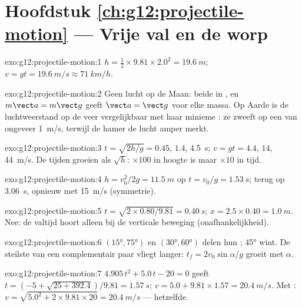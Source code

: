 \section*{Hoofdstuk \ref{ch:g12:projectile-motion} --- Vrije val en de worp}

\begin{solution}{exo:g12:projectile-motion:1}
$h = \tfrac12 \times 9.81 \times 2.0^2 = \qty{19.6}{m}$;
$v = gt = \qty{19.6}{m/s} \approx \qty{71}{km/h}$.
\end{solution}

\begin{solution}{exo:g12:projectile-motion:2}
Geen lucht op de Maan: beide in , en $m\vect a = m\vect g$ geeft
$\vect a = \vect g$ voor elke massa. Op Aarde is de luchtweerstand op de veer
vergelijkbaar met haar minieme : ze zweeft op een  van
ongeveer \qty{1}{m/s}, terwijl de hamer de lucht amper merkt.
\end{solution}

\begin{solution}{exo:g12:projectile-motion:3}
$t = \sqrt{2h/g} = 0.45$, $1.4$, \qty{4.5}{s};
$v = gt = 4.4$, $14$, \qty{44}{m/s}. De tijden groeien als $\sqrt h$:
$\times 100$ in hoogte is maar $\times 10$ in tijd.
\end{solution}

\begin{solution}{exo:g12:projectile-motion:4}
$h = v_0^2/2g = \qty{11.5}{m}$ op $t = v_0/g = \qty{1.53}{s}$; terug op
\qty{3.06}{s}, opnieuw met \qty{15}{m/s} (symmetrie).
\end{solution}

\begin{solution}{exo:g12:projectile-motion:5}
$t = \sqrt{2 \times 0.80/9.81} = \qty{0.40}{s}$;
$x = 2.5 \times 0.40 = \qty{1.0}{m}$. Nee: de valtijd hoort alleen bij de
verticale beweging (onafhankelijkheid).
\end{solution}

\begin{solution}{exo:g12:projectile-motion:6}
$(\ang{15},\ang{75})$ en $(\ang{30},\ang{60})$ delen hun ; \ang{45}
wint. De steilste van een complementair paar vliegt langer:
$t_f = 2v_0\sin\alpha/g$ groeit met $\alpha$.
\end{solution}

\begin{solution}{exo:g12:projectile-motion:7}
$4.905\,t^2 + 5.0\,t - 20 = 0$ geeft
$t = (-5 + \sqrt{25 + 392.4})/9.81 = \qty{1.57}{s}$;
$v = 5.0 + 9.81 \times 1.57 = \qty{20.4}{m/s}$. Met :
$v = \sqrt{5.0^2 + 2 \times 9.81 \times 20} = \qty{20.4}{m/s}$ --- hetzelfde.
\end{solution}

